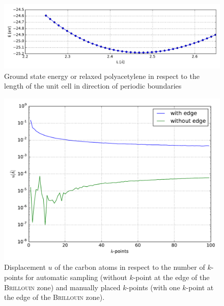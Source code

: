 \begin{figure}
	\centering
	\includegraphics[width = 12cm]{Images/polyacetylene/convergence/unit_cell_length}
	\caption{Ground state energy or relaxed polyacetylene in respect to the length of the unit cell in direction of periodic boundaries}
	\label{image_poly_cell_len}
\end{figure}
\begin{figure}
	\centering
	\includegraphics[width = 12cm]{Images/polyacetylene/convergence/polyacetylene_displacement}
	\caption{Displacement $u$ of the carbon atoms in respect to the number of $k$-points for automatic sampling (without $k$-point at the edge of the \textsc{Brillouin} zone) and manually placed $k$-points (with one $k$-point at the edge of the \textsc{Brillouin} zone).}
	\label{image_k_point_sampling_assymetry}
\end{figure}
